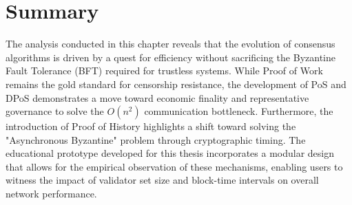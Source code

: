 \section{Summary}
The analysis conducted in this chapter reveals that the evolution of consensus algorithms is driven by a quest for efficiency without sacrificing the Byzantine Fault Tolerance (BFT) required for trustless systems. While Proof of Work remains the gold standard for censorship resistance, the development of PoS and DPoS demonstrates a move toward economic finality and representative governance to solve the $O(n^2)$ communication bottleneck. Furthermore, the introduction of Proof of History highlights a shift toward solving the "Asynchronous Byzantine" problem through cryptographic timing. The educational prototype developed for this thesis incorporates a modular design that allows for the empirical observation of these mechanisms, enabling users to witness the impact of validator set size and block-time intervals on overall network performance.

